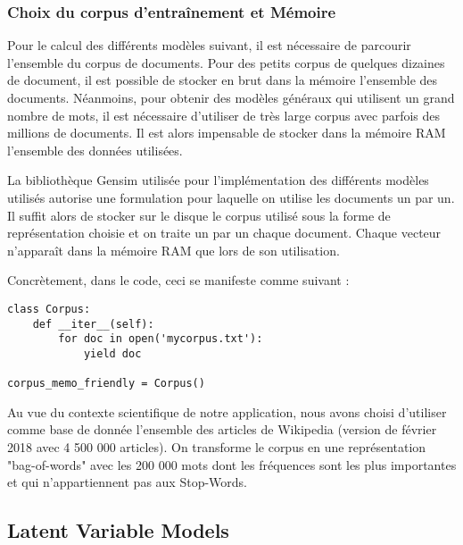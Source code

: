 \documentclass[12pt]{article}
\begin{document}
\subsubsection{Choix du corpus d'entraînement et Mémoire}
\noindent
Pour le calcul des différents modèles suivant, il est nécessaire de parcourir l'ensemble du corpus de documents. Pour des petits corpus de quelques dizaines de document, il est possible de stocker en brut dans la mémoire l'ensemble des documents. Néanmoins, pour obtenir des modèles généraux qui utilisent un grand nombre de mots, il est nécessaire d'utiliser de très large corpus avec parfois des millions de documents. Il est alors impensable de stocker dans la mémoire RAM l'ensemble des données utilisées. 

\noindent
La bibliothèque Gensim utilisée pour l'implémentation des différents modèles utilisés autorise une formulation pour laquelle on utilise les documents un par un. Il suffit alors de stocker sur le disque le corpus utilisé sous la forme de représentation choisie et on traite un par un chaque document. Chaque vecteur n'apparaît dans la mémoire RAM que lors de son utilisation. 

\noindent
Concrètement, dans le code, ceci se manifeste comme suivant :

\begin{verbatim}
class Corpus:
    def __iter__(self):
        for doc in open('mycorpus.txt'):
            yield doc
            
corpus_memo_friendly = Corpus()
\end{verbatim}

\noindent
Au vue du contexte scientifique de notre application, nous avons choisi d'utiliser comme base de donnée l'ensemble des articles de Wikipedia (version de février 2018 avec 4 500 000 articles). On transforme le corpus en une représentation "bag-of-words" avec les 200 000 mots dont les fréquences sont les plus importantes et qui n'appartiennent pas aux Stop-Words.

\subsection{Latent Variable Models}
\end{document}
